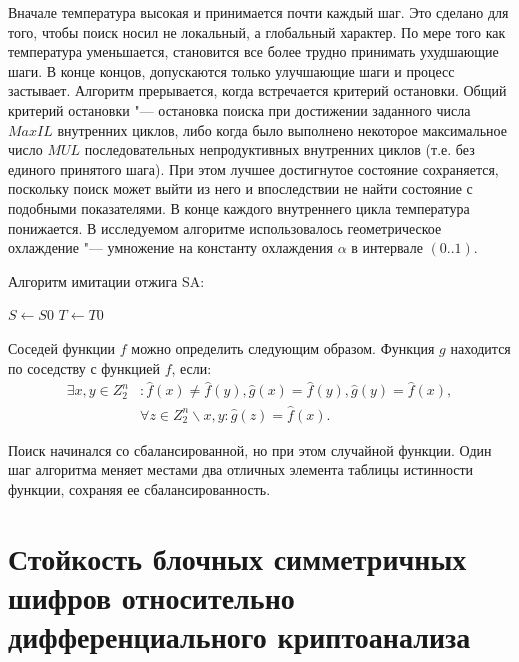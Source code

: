 Вначале температура высокая и принимается почти каждый шаг. Это сделано для
того, чтобы поиск носил не локальный, а глобальный характер. По мере того как
температура уменьшается, становится все более трудно принимать ухудшающие шаги.
В конце концов, допускаются только улучшающие шаги и процесс застывает. Алгоритм
прерывается, когда встречается критерий остановки. Общий критерий остановки "---
остановка поиска при достижении заданного числа $MaxIL$ внутренних циклов, либо
когда было выполнено некоторое максимальное число $MUL$ последовательных
непродуктивных внутренних циклов (т.е. без единого принятого шага). При этом
лучшее достигнутое состояние сохраняется, поскольку поиск может выйти из него и
впоследствии не найти состояние с подобными показателями. В конце каждого
внутреннего цикла температура понижается. В исследуемом алгоритме использовалось
геометрическое охлаждение "--- умножение на константу охлаждения $\alpha$ в
интервале $(0..1)$.

Алгоритм имитации отжига SA:

\begin{algorithm}
    \SetAlgoNoLine
    $S \leftarrow S0$\;
    $T \leftarrow T0$\;
\end{algorithm}

Соседей функции $f$ можно определить следующим образом. Функция $g$ находится по
соседству с функцией $f$, если:
\begin{equation}\begin{split}
\exists x,y \in Z^{n}_{2}&: \hat{f}(x) \neq \hat{f}(y), \hat{g}(x) = \hat{f}(y), \hat{g}(y) = \hat{f}(x), \\ 
& \forall z \in Z^{n}_{2} \backslash {x,y}: \hat{g}(z) = \hat{f}(x).
\end{split}\end{equation}

Поиск начинался со сбалансированной, но при этом случайной функции. Один шаг
алгоритма меняет местами два отличных элемента таблицы истинности функции,
сохраняя ее сбалансированность.

\section{Стойкость блочных симметричных шифров относительно дифференциального криптоанализа}

